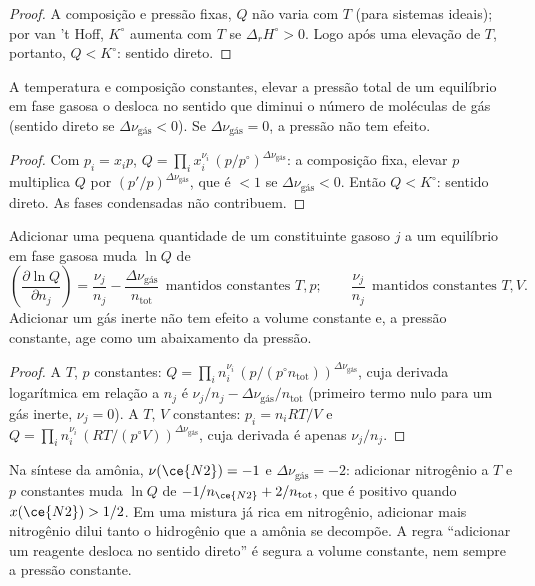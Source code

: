 \begin{proof}
A composição e pressão fixas, $Q$ não varia com $T$ (para sistemas
ideais); por van 't Hoff, $K^\circ$ aumenta com $T$ se $\Delta_r H^\circ >
0$. Logo após uma elevação de $T$, portanto, $Q < K^\circ$: sentido direto.
\end{proof}

\begin{proposition}[Pressão]\label{prop:b2:equilibrium-shifts:pressure}
A temperatura e composição constantes, elevar a pressão total de um
equilíbrio em fase gasosa o desloca no sentido que diminui o número de
moléculas de gás (sentido direto se $\Delta\nu_{\text{gás}} < 0$). Se $\Delta\nu_{\text{gás}}
= 0$, a pressão não tem efeito.
\end{proposition}

\begin{proof}
Com $p_i = x_ip$, $Q = \prod_i x_i^{\nu_i}\,(p/p^\circ)^{\Delta\nu_{\text{gás}}}$:
a composição fixa, elevar $p$ multiplica $Q$ por
$(p'/p)^{\Delta\nu_{\text{gás}}}$, que é $< 1$ se $\Delta\nu_{\text{gás}} <
0$. Então $Q < K^\circ$: sentido direto. As fases condensadas não contribuem.
\end{proof}

\begin{proposition}\label{prop:b2:equilibrium-shifts:adding}
Adicionar uma pequena quantidade de um constituinte gasoso $j$ a um equilíbrio
em fase gasosa muda $\ln Q$ de
\[
  \left(\frac{\partial\ln Q}{\partial n_j}\right) = \frac{\nu_j}{n_j} -
  \frac{\Delta\nu_{\text{gás}}}{n_{\text{tot}}}\ \ \text{mantidos constantes } T, p ;
  \qquad \frac{\nu_j}{n_j}\ \ \text{mantidos constantes } T, V .
\]
Adicionar um gás inerte não tem efeito a volume constante e, a pressão
constante, age como um abaixamento da pressão.
\end{proposition}

\begin{proof}
A $T$, $p$ constantes: $Q = \prod_i n_i^{\nu_i}\,(p/(p^\circ n_{\text{tot}}))^{
\Delta\nu_{\text{gás}}}$, cuja derivada logarítmica em relação a $n_j$ é
$\nu_j/n_j - \Delta\nu_{\text{gás}}/n_{\text{tot}}$ (primeiro termo nulo para
um gás inerte, $\nu_j = 0$). A $T$, $V$ constantes: $p_i = n_iRT/V$ e $Q = \prod_i n_i^{
\nu_i}\,(RT/(p^\circ V))^{\Delta\nu_{\text{gás}}}$, cuja derivada é apenas
$\nu_j/n_j$.
\end{proof}

\begin{remark}\label{rem:b2:equilibrium-shifts:paradox}
Na síntese da amônia, $\nu(\ce{N2}) = -1$ e $\Delta\nu_{\text{gás}} = -2$:
adicionar nitrogênio a $T$ e $p$ constantes muda $\ln Q$ de $-1/n_{\ce{N2}} +
2/n_{\text{tot}}$, que é positivo quando $x(\ce{N2}) > 1/2$. Em uma mistura
já rica em nitrogênio, adicionar mais nitrogênio dilui tanto o hidrogênio
que a amônia se decompõe. A regra ``adicionar um reagente desloca no sentido
direto'' é segura a volume constante, nem sempre a pressão constante.
\end{remark}

